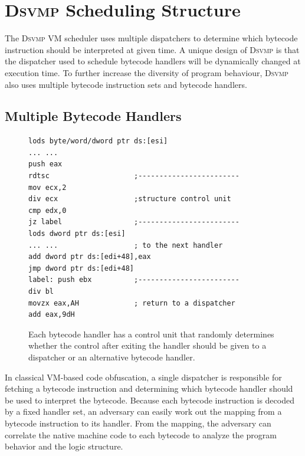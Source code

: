 \documentclass[preprint,12pt,3p]{elsarticle}
\newcommand{\DSVMP}{\textsc{Dsvmp}\xspace}
\begin{document}










\section{\DSVMP Scheduling Structure}\label{sec:dvs}

The \DSVMP VM scheduler uses multiple dispatchers to determine which bytecode instruction should be interpreted at given time.
A unique design of \DSVMP is that the dispatcher used to schedule bytecode handlers will be dynamically changed at execution time. To further increase the diversity of program behaviour, \DSVMP also uses multiple bytecode instruction sets and bytecode handlers.

\subsection{Multiple Bytecode Handlers}\label{sec:mb}

\begin{figure}[t!]
\scriptsize
\begin{lstlisting}
lods byte/word/dword ptr ds:[esi]
... ...
push eax
rdtsc                    ;------------------------
mov ecx,2
div ecx                  ;structure control unit
cmp edx,0
jz label                 ;------------------------
lods dword ptr ds:[esi]
... ...                  ; to the next handler
add dword ptr ds:[edi+48],eax
jmp dword ptr ds:[edi+48]
label: push ebx          ;------------------------
div bl
movzx eax,AH             ; return to a dispatcher
add eax,9dH
\end{lstlisting}
\caption{Each bytecode handler has a control unit that randomly determines whether the control after exiting the handler should be given to a dispatcher or an alternative bytecode handler. }
\label{fig:newhandler}
\end{figure}

In classical VM-based code obfuscation, a single dispatcher is responsible for fetching a bytecode instruction and
determining which bytecode handler should be used to interpret the bytecode. Because each bytecode instruction
is decoded by a fixed handler set, an adversary can easily work out the mapping from a bytecode instruction to its
handler. From the mapping, the adversary can correlate the native machine code to each bytecode to analyze the
program behavior and  the logic structure.
\end{document}
